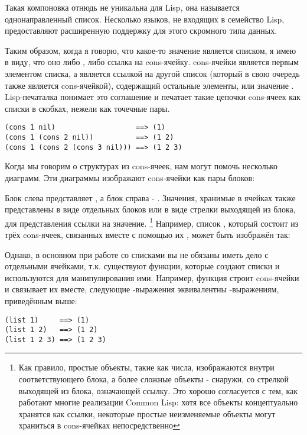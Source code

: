 Такая компоновка отнюдь не уникальна для Lisp, она называется однонаправленный
список. Несколько языков, не входящих в семейство Lisp, предоставляют расширенную
поддержку для этого скромного типа данных.

Таким образом, когда я говорю, что какое-то значение является списком, я имею в виду, что
оно либо , либо ссылка на cons-ячейку.  cons-ячейки является первым
элементом списка, а  является ссылкой на другой список (который в свою очередь
также является cons-ячейкой), содержащий остальные элементы, или значение
. Lisp-печаталка понимает это соглашение и печатает такие цепочки cons-ячеек как
списки в скобках, нежели как точечные пары.

\begin{lstlisting}
(cons 1 nil)                   ==> (1)
(cons 1 (cons 2 nil))          ==> (1 2)
(cons 1 (cons 2 (cons 3 nil))) ==> (1 2 3)
\end{lstlisting}

Когда мы говорим о структурах из cons-ячеек, нам могут помочь несколько диаграмм. Эти
диаграммы изображают cons-ячейки как пары блоков:


Блок слева представляет , а блок справа - . Значения, хранимые в
ячейках также представлены в виде отдельных блоков или в виде стрелки выходящей из блока,
для представления ссылки на значение. \footnote{Как правило, простые объекты, такие как
  числа, изображаются внутри соответствующего блока, а более сложные объекты - снаружи, со
  стрелкой выходящей из блока, означающей ссылку. Это хорошо согласуется с тем, как
  работают многие реализации Common Lisp: хотя все объекты концептуально хранятся как
  ссылки, некоторые простые неизменяемые объекты могут храниться в cons-ячейках
  непосредственно} Например, список , который состоит из трёх cons-ячеек,
связанных вместе с помощью их , может быть изображён так:


Однако, в основном при работе со списками вы не обязаны иметь дело с отдельными ячейками,
т.к. существуют функции, которые создают списки и используются для манипулирования
ими. Например, функция  строит cons-ячейки и связывает их вместе, следующие
-выражения эквивалентны -выражениям, приведённым выше:

\begin{lstlisting}
(list 1)     ==> (1)
(list 1 2)   ==> (1 2)
(list 1 2 3) ==> (1 2 3)
\end{lstlisting}

